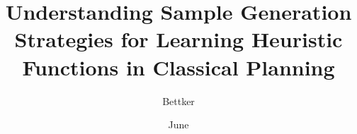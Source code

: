 \documentclass[inputs/ppgc,inputs/diss,english]{iiufrgs}
\title{Understanding Sample Generation Strategies for Learning Heuristic Functions in Classical Planning}
\author{Bettker}{Rafael Vales}
\date{June}{2023}
\begin{document}
\maketitle








\listoffigures
\listoftables
\listofalgorithms

\tableofcontents











\end{document}
